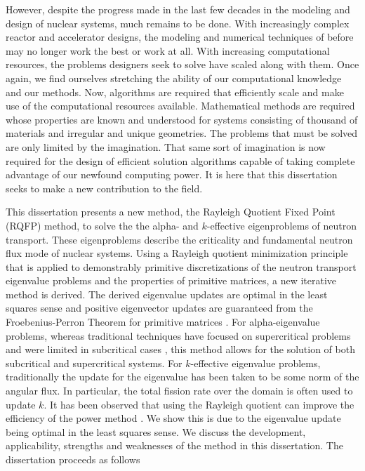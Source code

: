 However, despite the progress made in the last few decades in the modeling and design of nuclear systems, much remains to be done. With increasingly complex reactor and accelerator designs, the modeling and numerical techniques of before may no longer work the best or work at all. With increasing computational resources, the problems designers seek to solve have scaled along with them. Once again, we find ourselves stretching the ability of our computational knowledge and our methods. Now, algorithms are required that efficiently scale and make use of the computational resources available. Mathematical methods are required whose properties are known and understood for systems consisting of thousand of materials and irregular and unique geometries. The problems that must be solved are only limited by the imagination. That same sort of imagination is now required for the design of efficient solution algorithms capable of taking complete advantage of our newfound computing power. It is here that this dissertation seeks to make a new contribution to the field. 

This dissertation presents a new method, the Rayleigh Quotient Fixed Point (RQFP) method, to solve the the alpha- and $k$-effective eigenproblems of neutron transport. These eigenproblems describe the criticality and fundamental neutron flux mode of nuclear systems. Using a Rayleigh quotient minimization principle that is applied to demonstrably primitive discretizations of the neutron transport eigenvalue problems and the properties of primitive matrices, a new iterative method is derived. The derived eigenvalue updates are optimal in the least squares sense and positive eigenvector updates are guaranteed from the Froebenius-Perron Theorem for primitive matrices \cite{birkhoff_reactor_1958} \cite{birkhoff_positivity_1961}. For alpha-eigenvalue problems, whereas traditional techniques have focused on supercritical problems and were limited in subcritical cases \cite{hill_efficient_1983}, this method allows for the solution of both subcritical and supercritical systems. For $k$-effective eigenvalue problems, traditionally the update for the eigenvalue has been taken to be some norm of the angular flux. In particular, the total fission rate over the domain is often used to update $k$. It has been observed that using the Rayleigh quotient can improve the efficiency of the power method \cite{warsa2004krylov}. We show this is due to the eigenvalue update being optimal in the least squares sense. 
We discuss the development, applicability, strengths and weaknesses of the method in this dissertation. The dissertation proceeds as follows

